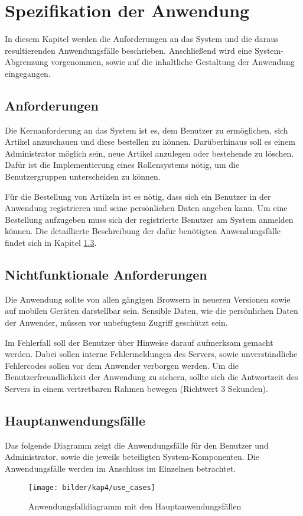 \section{Spezifikation der Anwendung}\label{specification}
In diesem Kapitel werden die Anforderungen an das System und die daraus resultierenden Anwendungsfälle beschrieben.
Anschließend wird eine System-Abgrenzung vorgenommen, sowie auf die inhaltliche Gestaltung der Anwendung eingegangen.

\subsection{Anforderungen}
Die Kernanforderung an das System ist es, dem Benutzer zu ermöglichen, sich Artikel anzuschauen und diese bestellen zu können.
Darüberhinaus soll es einem Administrator möglich sein, neue Artikel anzulegen oder bestehende zu löschen.
Dafür ist die Implementierung eines Rollensystems nötig, um die Benutzergruppen unterscheiden zu können.

Für die Bestellung von Artikeln ist es nötig, dass sich ein Benutzer in der Anwendung registrieren und seine persönlichen Daten angeben kann.
Um eine Bestellung aufzugeben muss sich der registrierte Benutzer am System anmelden können.
Die detaillierte Beschreibung der dafür benötigten Anwendungsfälle findet sich in Kapitel \ref{usecases}.
\subsection{Nichtfunktionale Anforderungen}
Die Anwendung sollte von allen gängigen Browsern in neueren Versionen sowie auf mobilen Geräten darstellbar sein.
Sensible Daten, wie die persönlichen Daten der Anwender, müssen vor unbefugtem Zugriff geschützt sein.

Im Fehlerfall soll der Benutzer über Hinweise darauf aufmerksam gemacht werden.
Dabei sollen interne Fehlermeldungen des Servers, sowie unverständliche Fehlercodes sollen vor dem Anwender verborgen werden.
Um die Benutzerfreundlichkeit der Anwendung zu sichern, sollte sich die Antwortzeit des Servers in einem vertretbaren Rahmen bewegen (Richtwert 3 Sekunden).
\subsection{Hauptanwendungsfälle}\label{usecases}
Das folgende Diagramm zeigt die Anwendungsfälle für den Benutzer und Administrator, sowie die jeweils beteiligten System-Komponenten.
Die Anwendungsfälle werden im Anschluss im Einzelnen betrachtet.
\begin{figure}[ht!]
	\centering
	\texttt{[image: bilder/kap4/use\_cases]}
	\caption{Anwendungsfalldiagramm mit den Hauptanwendungsfällen}
	\label{fig:usecases}
\end{figure}

